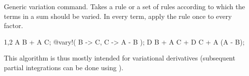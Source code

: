 
Generic variation command.  Takes a rule or a set of rules
according to which the terms in a sum should be varied. In every term,
apply the rule once to every factor.
\begin{screen}{1,2}
A B + A C;
@vary!(%
           B -> \epsilon C,
           C -> \epsilon A - \epsilon B );
\epsilon D B + A \epsilon C + \epsilon D C + A (\epsilon A - \epsilon B);
\end{screen}
This algorithm is thus mostly intended for variational derivatives
(subsequent partial integrations can be done using ).


